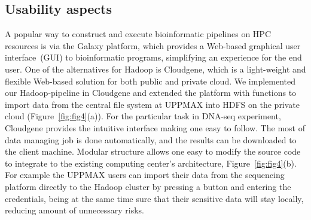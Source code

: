 \documentclass[11pt, oneside]{article}   	%
\begin{document}
\subsection{Usability aspects}
\label{subsectionIV_2}

A popular way to construct and execute bioinformatic pipelines on HPC resources is via the Galaxy\cite{galaxy} platform, which provides a Web-based graphical user interface~(GUI) to bioinformatic programs, simplifying an experience for the end user. 
One of the alternatives for Hadoop is Cloudgene\cite{cloudgene}, which is a light-weight and flexible Web-based solution for both public and private cloud. We implemented our Hadoop-pipeline in Cloudgene and extended the platform with functions to import data from the central file system at UPPMAX into HDFS on the private cloud (Figure~\ref{fig:fig4}(a)).
For the particular task in DNA-seq experiment, Cloudgene provides the intuitive interface making one easy to follow. The most of data managing job is done automatically, and the results can be downloaded to the client machine. Modular structure allows one easy to modify the source code to integrate to the existing computing center’s architecture, Figure~\ref{fig:fig4}(b). For example the UPPMAX users can import their data from the sequencing platform directly to the Hadoop cluster by pressing a button and entering the credentials, being at the same time sure that their sensitive data will stay locally, reducing amount of unnecessary risks.
\end{document}
